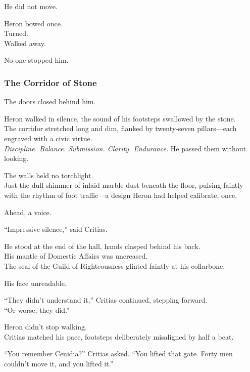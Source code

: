 \documentclass[12pt]{article}
\begin{document}
He did not move.

\vspace{1em}

Heron bowed once.\\
Turned.\\
Walked away.

No one stopped him.

\dotfill

\subsubsection*{The Corridor of Stone}

The doors closed behind him.

Heron walked in silence, the sound of his footsteps swallowed by the stone.\\
The corridor stretched long and dim, flanked by twenty-seven pillars—each engraved with a civic virtue.\\
\textit{Discipline. Balance. Submission. Clarity. Endurance.}  
He passed them without looking.

The walls held no torchlight.\\
Just the dull shimmer of inlaid marble dust beneath the floor, pulsing faintly with the rhythm of foot traffic—a design Heron had helped calibrate, once.

Ahead, a voice.

\vspace{1em}

“Impressive silence,” said Critias.

He stood at the end of the hall, hands clasped behind his back.\\
His mantle of Domestic Affairs was uncreased.\\
The seal of the Guild of Righteousness glinted faintly at his collarbone.

His face unreadable.

\vspace{1em}

“They didn’t understand it,” Critias continued, stepping forward.\\
“Or worse, they did.”

Heron didn’t stop walking.\\
Critias matched his pace, footsteps deliberately misaligned by half a beat.

\vspace{1em}

“You remember Cenidia?” Critias asked.  
“You lifted that gate. Forty men couldn’t move it, and you lifted it.”
\end{document}
